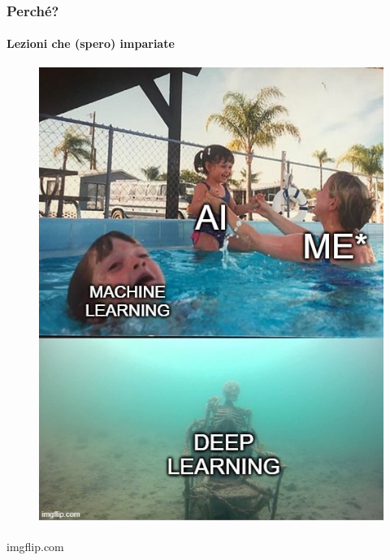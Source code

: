 \begin{frame}[t] \frametitle{Perché?}
\framesubtitle{Lezioni che (spero) impariate}
{\scriptsize
    \begin{minipage}[b]{\textwidth}
        \begin{minipage}[b]{0.33\textwidth}
            \centering
            \begin{figure}[ht]
                \includegraphics[width=\textwidth]{img/meme-2.jpg}
            \end{figure}
            \begin{flushright}
                \vspace*{-7pt}
                {\tiny\textsuperscript{\textcopyright}imgflip.com}
            \end{flushright}
        \end{minipage}
        \begin{minipage}[b]{0.33\textwidth}
            \centering
            \begin{figure}[ht]

\end{figure}
\end{minipage}
\end{minipage}}
\end{frame}

